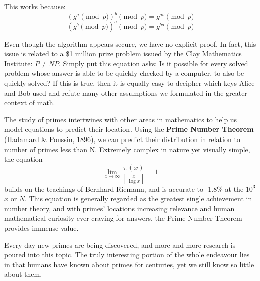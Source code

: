 This works because:
\[{(g^a \pmod{p})}^b \pmod{p} = g^{ab} \pmod{p}\]
\[{(g^b \pmod{p})}^a \pmod{p} = g^{ba} \pmod{p}\]

Even though the algorithm appears secure, we have no explicit proof. In fact, this issue is related to a \$1 million prize problem issued by the Clay Mathematics Institute: \(P \neq NP\). Simply put this equation asks: Is it possible for every solved problem whose answer is able to be quickly checked by a computer, to also be quickly solved? If this is true, then it is equally easy to decipher which keys Alice and Bob used and refute many other assumptions we formulated in the greater context of math.

The study of primes intertwines with other areas in mathematics to help us model equations to predict their location. Using the \textbf{Prime Number Theorem} (Hadamard \& Poussin, 1896), we can predict their distribution in relation to number of primes less than N. Extremely complex in nature yet visually simple, the equation
\[
\lim_{x\to\infty} \frac{\pi(x)}{[\frac{x}{\log{x}}]} = 1    
\]
builds on the teachings of Bernhard Riemann, and is accurate to -1.8\% at the \(10^3\) \(x\) or \(N\). This equation is generally regarded as the greatest single achievement in number theory, and with primes’ locations increasing relevance and human mathematical curiosity ever craving for answers, the Prime Number Theorem provides immense value. 

Every day new primes are being discovered, and more and more research is poured into this topic. The truly interesting portion of the whole endeavour lies in that humans have known about primes for centuries, yet we still know so little about them. 
